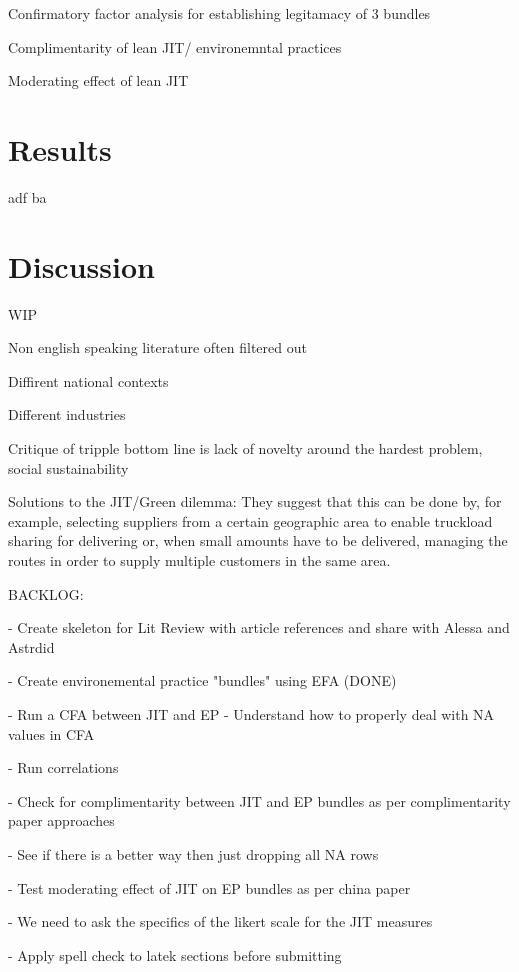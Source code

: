 \documentclass[]{article}
\begin{document}
Confirmatory factor analysis for establishing legitamacy of 3 bundles

Complimentarity of lean JIT/ environemntal practices

Moderating effect of lean JIT 


\section{Results}

adf ba 
\section{Discussion}
WIP

Non english speaking literature often filtered out

Diffirent national contexts

Different industries

Critique of tripple bottom line is lack of novelty around the hardest problem, social sustainability

Solutions to the JIT/Green dilemma: They suggest that this can be done by, for example, selecting suppliers from a certain geographic area to enable truckload sharing for delivering or, when small amounts have to be delivered, managing the routes in order to supply multiple customers in the same area. 

BACKLOG:

- Create skeleton for Lit Review with article references and share with Alessa and Astrdid

- Create environemental practice "bundles" using EFA (DONE)

- Run a CFA between JIT and EP
 - Understand how to properly deal with NA values in CFA

- Run correlations

- Check for complimentarity between JIT and EP bundles as per complimentarity paper approaches

- See if there is a better way then just dropping all NA rows

- Test moderating effect of JIT on EP bundles as per china paper

- We need to ask the specifics of the likert scale for the JIT measures

- Apply spell check to latek sections before submitting

\end{document}
